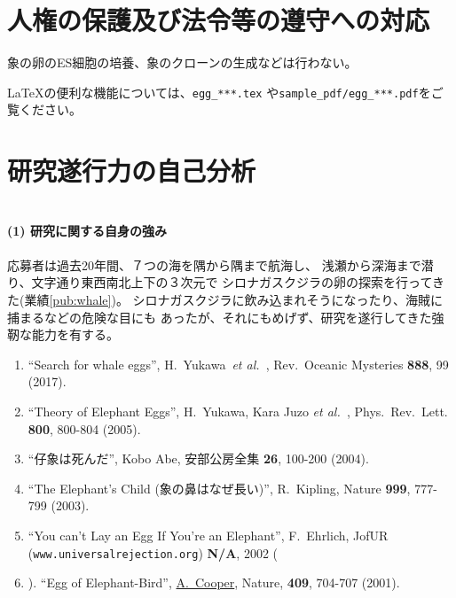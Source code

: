 \documentclass[11pt,a4j,dvipdfmx]{jarticle} 					%
\newcommand{\研究課題名}{象の卵}
\newcommand{\研究機関名}{逢坂大学}
\newcommand{\研究代表者氏名}{湯川秀樹}
\newcommand{\paper}[6]{%
	\item ``#1'', #2, #3 {\bf #4}, #5 (#6).			%
}
\newcommand{\etal}{\textit{et al.\ }}
\newcommand{\yukawa}{H.~Yukawa}					%
\newcommand{\prl}{Phys.\ Rev.\ Lett.\ }		%
\begin{document}



\section{人権の保護及び法令等の遵守への対応}

	象の卵のES細胞の培養、象のクローンの生成などは行わない。

	\LaTeX の便利な機能については、\texttt{egg\_***.tex} や\texttt{sample\_pdf/egg\_***.pdf}をご覧ください。




\section{研究遂行力の自己分析}

\SelfReviewInstructions\\%
\noindent
\textbf{(1) 研究に関する自身の強み}\\
\PapersInstructions\\ %
	応募者は過去20年間、７つの海を隅から隅まで航海し、
	浅瀬から深海まで潜り、文字通り東西南北上下の３次元で
	シロナガスクジラの卵の探索を行ってきた(業績\ref{pub:whale})。
	シロナガスクジラに飲み込まれそうになったり、海賊に捕まるなどの危険な目にも
	あったが、それにもめげず、研究を遂行してきた強靭な能力を有する。
	\begin{enumerate}
		\paper{Search for whale eggs}{\yukawa\ \etal}{Rev.\ Oceanic Mysteries}{888}{99}{2017}
			\label{pub:whale}
				
		\paper{Theory of Elephant Eggs}{\yukawa, Kara Juzo \etal}{\prl}{800}{800-804}{2005}
			\label{pub:theoegg}
				
		\paper{仔象は死んだ}{Kobo Abe}{安部公房全集}{26}{100-200}{2004}
		
		\paper{The Elephant's Child (象の鼻はなぜ長い)}{R.~Kipling}{Nature}{999}{777-799}{2003}

		\paper{You can't Lay an Egg If You're an Elephant}{F.~Ehrlich}
			{JofUR\\({\tt www.universalrejection.org})}{{\bf N/A}}{2002}
		
		\item ``Egg of Elephant-Bird'', 
				\underline{A.~Cooper},
				Nature, {\bf 409}, 704-707 (2001).	%
	\end{enumerate}
\end{document}
